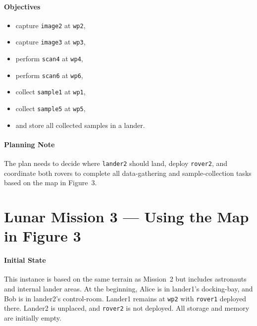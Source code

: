 \documentclass[11pt,a4paper]{article}
\begin{document}
\paragraph{Objectives}
\begin{itemize}
  \item capture \texttt{image2} at \texttt{wp2},
  \item capture \texttt{image3} at \texttt{wp3},
  \item perform \texttt{scan4} at \texttt{wp4},
  \item perform \texttt{scan6} at \texttt{wp6},
  \item collect \texttt{sample1} at \texttt{wp1},
  \item collect \texttt{sample5} at \texttt{wp5},
  \item and store all collected samples in a lander.
\end{itemize}

\paragraph{Planning Note}
The plan needs to decide where \texttt{lander2} should land, deploy \texttt{rover2}, and coordinate both rovers to complete all data-gathering and sample-collection tasks based on the map in Figure~3.


\section{Lunar Mission 3 — Using the Map in Figure 3}

\paragraph{Initial State}
This instance is based on the same terrain as Mission~2 but includes astronauts and internal lander areas. At the beginning, Alice is in lander1’s docking-bay, and Bob is in lander2’s control-room. Lander1 remains at \texttt{wp2} with \texttt{rover1} deployed there. Lander2 is unplaced, and \texttt{rover2} is not deployed. All storage and memory are initially empty.
\end{document}
